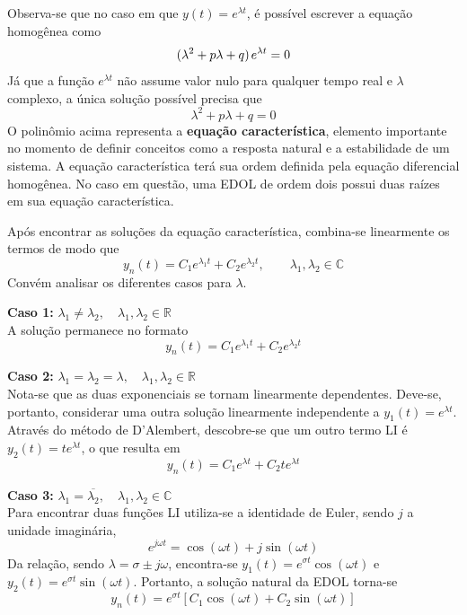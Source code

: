 \documentclass{article}
\numberwithin{equation}{section}
\newcommand{\itembull}[1]{\noindent\textbf{\small{\textbullet \hspace{1.5mm}#1}}}
\begin{document}
Observa-se que no caso em que $y(t) = e^{\lambda t}$, é possível escrever a equação homogênea como
\begin{equation*}
    (\lambda^{2}+p\lambda+q)\hspace{0.05cm} e^{\lambda t} = 0
\end{equation*}
Já que a função $e^{\lambda t}$ não assume valor nulo para qualquer tempo real e $\lambda$ complexo, a única solução possível precisa que
\begin{equation}
    \lambda^{2}+p\lambda+q=0
\end{equation}
O polinômio acima representa a \textbf{equação característica}, elemento importante no momento de definir conceitos como a resposta natural e a estabilidade de um sistema. A equação característica terá sua ordem definida pela equação diferencial homogênea. No caso em questão, uma EDOL de ordem dois possui duas raízes em sua equação característica.

Após encontrar as soluções da equação característica, combina-se linearmente os termos de modo que
\begin{equation*}
    \displaystyle y_{n}(t)=C_{1}e^{\lambda_{1}t}+C_{2}e^{\lambda_{2}t}, \qquad \lambda_{1},\lambda_{2} \in \mathbb{C}
\end{equation*}
Convém analisar os diferentes casos para $\lambda$.

\itembull{Caso 1:} $\lambda_{1} \neq \lambda_{2}, \quad \lambda_{1},\lambda_{2} \in \mathbb{R} $ \\
A solução permanece no formato
\begin{equation*}
    \displaystyle y_{n}(t)=C_{1}e^{\lambda_{1}t}+C_{2}e^{\lambda_{2}t}
\end{equation*}

\itembull{Caso 2:} $\lambda_{1} = \lambda_{2} = \lambda, \quad \lambda_{1},\lambda_{2} \in \mathbb{R}$ \\
Nota-se que as duas exponenciais se tornam linearmente dependentes. Deve-se, portanto, considerar uma outra solução linearmente independente a $y_{1}(t)=e^{\lambda t}$. Através do método de D'Alembert, descobre-se que um outro termo LI é $y_{2}(t)=te^{\lambda t}$, o que resulta em
\begin{equation*}
    \displaystyle y_{n}(t)=C_{1}e^{\lambda t}+C_{2}te^{\lambda t}
\end{equation*}

\itembull{Caso 3:} $\lambda_{1} = \overline{\lambda_{2}}, \quad \lambda_{1},\lambda_{2} \in \mathbb{C}$ \\
Para encontrar duas funções LI utiliza-se a identidade de Euler, sendo $j$ a unidade imaginária,
\begin{equation}
    e^{j\omega t}=\cos{(\omega t)}+j\sin{(\omega t)}
\end{equation}
Da relação, sendo $\lambda = \sigma \pm j\omega$, encontra-se $y_{1}(t)=e^{\sigma t}\cos{(\omega t)}$ e $y_{2}(t)=e^{\sigma t}\sin{(\omega t)}$. Portanto, a solução natural da EDOL torna-se
\begin{equation*}
    \displaystyle y_{n}(t)=e^{\sigma t}[C_{1}\cos{(\omega t)}+C_{2}\sin{(\omega t)}]
\end{equation*}
\end{document}
